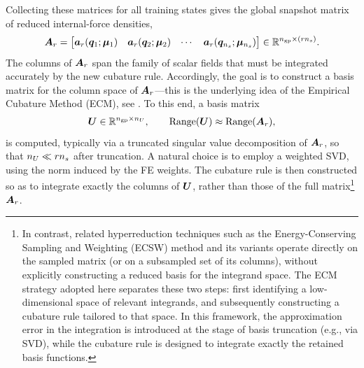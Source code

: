 \documentclass[11pt,a4paper]{article}
\begin{document}
Collecting these matrices for all training states gives the global snapshot
matrix of reduced internal-force densities,
\begin{equation}
\label{eq:aforce_orig}
    \bm{A}_{r}
    =
    \begin{bmatrix}
        \bm{a}_{r}(\bm{q}_1;\bm{\mu}_1) &
        \bm{a}_{r}(\bm{q}_2;\bm{\mu}_2) &
        \cdots &
        \bm{a}_{r}(\bm{q}_{n_s};\bm{\mu}_{n_s})
    \end{bmatrix}
    \in \mathbb{R}^{n_{\mathrm{gp}}\times(rn_s)}.
    \label{eq:Aforce_training_matrix}
\end{equation}
The columns of $\bm{A}_{r}$ span the family of scalar fields that must be
integrated accurately by the new cubature rule. Accordingly, the goal is to
construct a basis matrix for the column space of $\bm{A}_{r}$---this is the
underlying idea of the Empirical Cubature Method (ECM), see
\cite{hernandez2024cecm}.  To this end, a basis matrix
\begin{equation}
    \bm{U} \in \mathbb{R}^{n_{\mathrm{gp}}\times n_U},
    \qquad
    \operatorname{Range}(\bm{U}) \approx \operatorname{Range}(\bm{A}_{r}),
\end{equation}
is computed, typically via a truncated singular value decomposition of
$\bm{A}_{r}$, so that $n_U \ll rn_s$ after truncation. A natural choice is
to employ a weighted SVD, using the norm induced by the FE weights. The
cubature rule is then constructed so as to integrate exactly the columns of
$\bm{U}$, rather than those of the full matrix\footnote{In contrast, related hyperreduction techniques such as the Energy-Conserving
Sampling and Weighting (ECSW) method and its variants
\cite{farhat2014dimensional,farhat2015structure} operate directly on the sampled
matrix (or on a subsampled set of its columns), without explicitly constructing
a reduced basis for the integrand space. The ECM strategy adopted here separates
these two steps: first identifying a low-dimensional space of relevant
integrands, and subsequently constructing a cubature rule tailored to that
space. In this framework, the approximation error in the integration is
introduced at the stage of basis truncation (e.g., via SVD), while the cubature
rule is designed to integrate exactly the retained basis functions.} $\bm{A}_{r}$.
\end{document}
